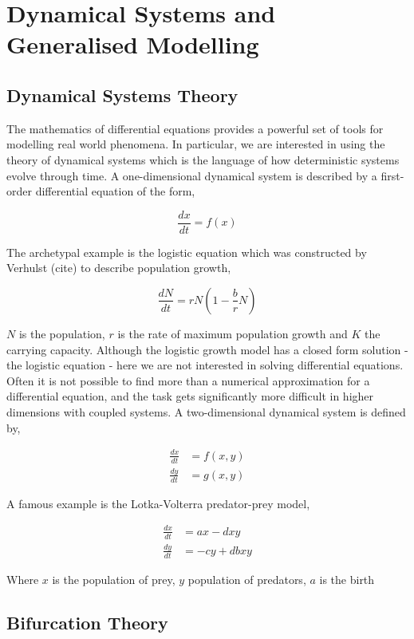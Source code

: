 \documentclass[11pt, a4paper]{book}
\begin{document}
\chapter{Dynamical Systems and Generalised Modelling}
\label{cha:methodology}

\section{Dynamical Systems Theory}
\label{sec:dynamicalIntro}
The mathematics of differential equations provides a powerful set of tools for modelling real world phenomena. In particular, we are interested in using the theory of dynamical systems which is the language of how deterministic systems evolve through time. A one-dimensional dynamical system is described by a first-order differential equation of the form,

\[\frac{dx}{dt} = f(x) \]

The archetypal example is the logistic equation which was constructed by Verhulst (cite) to describe population growth,

\[\frac{dN}{dt} = rN\left(1-\frac{b}{r}N\right) \]

$N$ is the population, $r$ is the rate of maximum population growth and $K$ the carrying capacity. Although the logistic growth model has a closed form solution - the logistic equation - here we are not interested in solving differential equations. Often it is not possible to find more than a numerical approximation for a differential equation, and the task gets significantly more difficult in higher dimensions with coupled systems. A two-dimensional dynamical system is defined by,

\begin{eqnarray}
\frac{dx}{dt} &= f(x,y) \\
\frac{dy}{dt} &= g(x,y)
\end{eqnarray}

A famous example is the Lotka-Volterra predator-prey model,

\begin{eqnarray}
\frac{dx}{dt} &= ax-dxy \\
\frac{dy}{dt} &= -cy +dbxy
\end{eqnarray}

Where $x$ is the population of prey, $y$ population of predators, $a$ is the birth 


\section{Bifurcation Theory}
\label{sec:bifurcationTheory}



\end{document}
